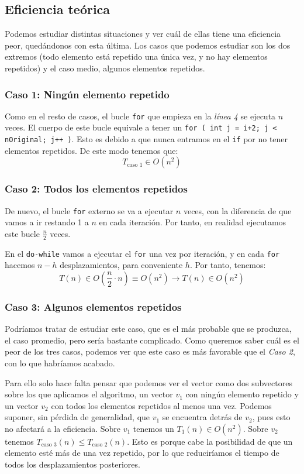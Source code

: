 \documentclass[10pt, a4paper]{article}
\theoremstyle{theorem-style}
\theoremstyle{theorem-style}
\theoremstyle{definition-style}
\theoremstyle{remark-style}
\theoremstyle{example-style}
\theoremstyle{definition-style}
\theoremstyle{remark-style}
\begin{document}
\subsection{Eficiencia teórica}

Podemos estudiar distintas situaciones y ver cuál de ellas tiene una eficiencia peor, quedándonos con esta última. Los casos que podemos estudiar son los dos extremos (todo elemento está repetido una única vez, y no hay elementos repetidos) y el caso medio, algunos elementos repetidos.

\subsubsection*{Caso 1: Ningún elemento repetido}

Como en el resto de casos, el bucle \texttt{for} que empieza en la \emph{línea 4} se ejecuta $n$ veces. El cuerpo de este bucle equivale a tener un \texttt{for ( int j = i+2; j < nOriginal; j++ )}. Esto es debido a que nunca entramos en el \texttt{if} por no tener elementos repetidos. De este modo tenemos que:
$$ T_{\text{caso 1}} \in O(n^2)$$

\subsubsection*{Caso 2: Todos los elementos repetidos}

De nuevo, el bucle \texttt{for} externo se va a ejecutar $n$ veces, con la diferencia de que vamos a ir restando 1 a $n$ en cada iteración. Por tanto, en realidad ejecutamos este bucle $\frac{n}{2}$ veces.

En el \texttt{do-while} vamos a ejecutar el \texttt{for} una vez por iteración, y en cada \texttt{for} hacemos $n-h$ desplazamientos, para conveniente $h$. Por tanto, tenemos:
$$ T(n) \in O\left(\frac{n}{2} \cdot n\right) \equiv O(n^2) \longrightarrow T(n) \in O(n^2) $$

\subsubsection*{Caso 3: Algunos elementos repetidos}

Podríamos tratar de estudiar este caso, que es el más probable que se produzca, el caso promedio, pero sería bastante complicado. Como queremos saber cuál es el peor de los tres casos, podemos ver que este caso es más favorable que el \emph{Caso 2}, con lo que habríamos acabado.

Para ello solo hace falta pensar que podemos ver el vector como dos subvectores sobre los que aplicamos el algoritmo, un vector $v_1$ con ningún elemento repetido y un vector $v_2$ con todos los elementos repetidos al menos una vez. Podemos suponer, sin pérdida de generalidad, que $v_1$ se encuentra detrás de $v_2$, pues esto no afectará a la eficiencia. Sobre $v_1$ tenemos un $T_1(n) \in O(n^2)$. Sobre $v_2$ tenemos $T_{\text{caso 3}}(n) \leq T_{\text{caso 2}}(n)$. Esto es porque cabe la posibilidad de que un elemento esté más de una vez repetido, por lo que reduciríamos el tiempo de todos los desplazamientos posteriores.
\end{document}
